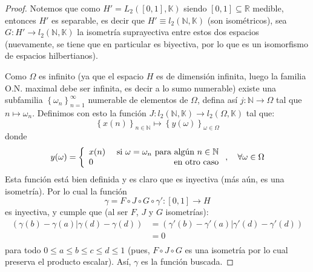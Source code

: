 \documentclass[12pt]{report}
\newcounter{it}
\theoremstyle{largebreak}
\newcommand\cf[3]{\ensuremath{#1:#2\rightarrow#3}}
\newcommand\pint[2]{\ensuremath{\left(#1\big|#2\right)}}
\begin{document}
\begin{proof}
        Notemos que como $H'=L_2([0,1],\mathbb{K})$ siendo $[0,1]\subseteq\mathbb{R}$ medible, entonces $H'$ es separable, es decir que $H'\equiv l_2(\mathbb{N},\mathbb{K})$ (son isométricos), sea $\cf{G}{H'}{l_2(\mathbb{N},\mathbb{K})}$ la isometría suprayectiva entre estos dos espacios (nuevamente, se tiene que en particular es biyectiva, por lo que es un isomorfismo de espacios hilbertianos).

        Como $\Omega$ es infinito (ya que el espacio $H$ es de dimensión infinita, luego la familia O.N. maximal debe ser infinita, es decir a lo sumo numerable) existe una subfamilia $\left\{\omega_n \right\}_{n=1}^\infty$ numerable de elementos de $\Omega$, defina así $\cf{j}{\mathbb{N}}{\Omega}$ tal que $n\mapsto \omega_n$. Definimos con esto la función $\cf{J}{l_2(\mathbb{N},\mathbb{K})}{l_2(\Omega,\mathbb{K})}$ tal que:
        \begin{equation*}
            \left\{x(n) \right\}_{n\in\mathbb{N}}\mapsto\left\{y(\omega) \right\}_{\omega\in\Omega}
        \end{equation*}
        donde
        \begin{equation*}
            y(\omega)=\left\{
                \begin{array}{lr}
                    x(n) & \textup{ si }\omega=\omega_n\textup{ para algún }n\in\mathbb{N}\\
                    0 & \textup{ en otro caso} \\
                \end{array}
            \right.
            ,\quad\forall\omega\in\Omega
        \end{equation*}
        Esta función está bien definida y es claro que es inyectiva (más aún, es una isometría). Por lo cual la función
        \begin{equation*}
            \gamma=F\circ J\circ G\circ \gamma':[0,1]\rightarrow H
        \end{equation*}
        es inyectiva, y cumple que (al ser $F$, $J$ y $G$ isometrías):
        \begin{equation*}
            \begin{split}
                \pint{\gamma(b)-\gamma(a)}{\gamma(d)-\gamma(d)}&=\pint{\gamma'(b)-\gamma'(a)}{\gamma'(d)-\gamma'(d)}\\
                &=0\\
            \end{split}
        \end{equation*}
        para todo $0\leq a\leq b\leq c\leq d\leq 1$ (pues, $F\circ J\circ G$ es una isometría por lo cual preserva el producto escalar). Así, $\gamma$ es la función buscada.
    \end{proof}
\end{document}
